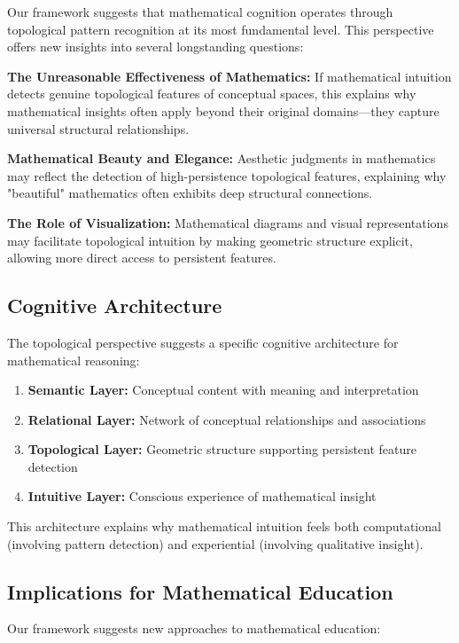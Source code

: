 \documentclass[11pt]{article}
\begin{document}
Our framework suggests that mathematical cognition operates through topological pattern recognition at its most fundamental level. This perspective offers new insights into several longstanding questions:

\textbf{The Unreasonable Effectiveness of Mathematics:} If mathematical intuition detects genuine topological features of conceptual spaces, this explains why mathematical insights often apply beyond their original domains—they capture universal structural relationships.

\textbf{Mathematical Beauty and Elegance:} Aesthetic judgments in mathematics may reflect the detection of high-persistence topological features, explaining why "beautiful" mathematics often exhibits deep structural connections.

\textbf{The Role of Visualization:} Mathematical diagrams and visual representations may facilitate topological intuition by making geometric structure explicit, allowing more direct access to persistent features.

\subsection{Cognitive Architecture}

The topological perspective suggests a specific cognitive architecture for mathematical reasoning:

\begin{enumerate}
\item \textbf{Semantic Layer:} Conceptual content with meaning and interpretation
\item \textbf{Relational Layer:} Network of conceptual relationships and associations  
\item \textbf{Topological Layer:} Geometric structure supporting persistent feature detection
\item \textbf{Intuitive Layer:} Conscious experience of mathematical insight
\end{enumerate}

This architecture explains why mathematical intuition feels both computational (involving pattern detection) and experiential (involving qualitative insight).

\subsection{Implications for Mathematical Education}

Our framework suggests new approaches to mathematical education:
\end{document}
